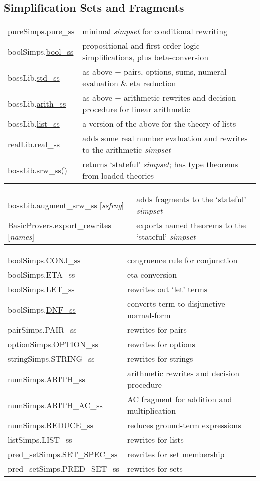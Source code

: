 \documentclass[landscape,10pt]{article}
\newcommand{\hol}[2]{{\sffamily #1.\href{http://hol-theorem-prover.org/kananaskis-10-helpdocs/help/Docfiles/HTML/#1.#2.html}{#2}}}
\newcommand{\holnoref}[2]{{\sffamily #1.#2}}
\newcommand{\var}[1]{{\emph{#1}}}
\begin{document}
\begin{multicols}{2}
\subsection*{Simplification Sets and Fragments}
\begin{tabular}{ll}
\hol{pureSimps}{pure_ss} & minimal \emph{simpset} for conditional rewriting \\
\hol{boolSimps}{bool_ss} & propositional and first-order logic simplifications, plus beta-conversion \\
\hol{bossLib}{std_ss} & as above + pairs, options, sums, numeral evaluation \& eta reduction \\
\hol{bossLib}{arith_ss} & as above + arithmetic rewrites and decision procedure for linear arithmetic \\
\hol{bossLib}{list_ss} & a version of the above for the theory of lists \\
\holnoref{realLib}{real_ss} & adds some real number evaluation and rewrites to the arithmetic \emph{simpset} \\
\hol{bossLib}{srw_ss}() & returns `stateful' \emph{simpset}; has type theorems from loaded theories
\end{tabular}

\medskip
\noindent\begin{tabular}{ll}
\hol{bossLib}{augment_srw_ss} [\var{ssfrag}] & adds fragments to the `stateful' \emph{simpset} \\
\hol{BasicProvers}{export_rewrites} [\var{names}] & exports named theorems to the `stateful' \emph{simpset} \\
\end{tabular}


\noindent\begin{tabular}{ll}
\holnoref{boolSimps}{CONJ_ss} & congruence rule for conjunction \\
\holnoref{boolSimps}{ETA_ss} & eta conversion \\
\holnoref{boolSimps}{LET_ss} & rewrites out `let' terms \\
\hol{boolSimps}{DNF_ss} & converts term to disjunctive-normal-form\\
\holnoref{pairSimps}{PAIR_ss} & rewrites for pairs \\
\holnoref{optionSimps}{OPTION_ss} & rewrites for options \\
\holnoref{stringSimps}{STRING_ss} & rewrites for strings \\
\holnoref{numSimps}{ARITH_ss} & arithmetic rewrites and decision procedure \\
\holnoref{numSimps}{ARITH_AC_ss} & AC fragment for addition and multiplication \\
\holnoref{numSimps}{REDUCE_ss} & reduces ground-term expressions \\
\holnoref{listSimps}{LIST_ss} & rewrites for lists \\
\holnoref{pred_setSimps}{SET_SPEC_ss} & rewrites for set membership \\
\holnoref{pred_setSimps}{PRED_SET_ss} & rewrites for sets \\
\end{tabular}
\end{multicols}
\end{document}
